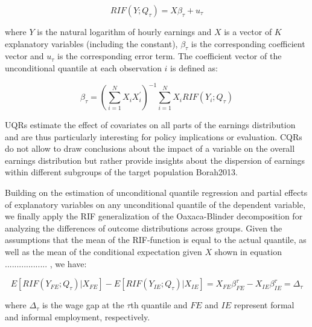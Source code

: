 \begin{linenomath*}
	\begin{equation}
		RIF(Y; Q_{\tau}) = X \beta_{\tau} + u_{\tau}
	\end{equation}
\end{linenomath*}

where $Y$ is the natural logarithm of hourly earnings and $X$ is a vector of $K$ explanatory variables (including the constant), $\beta_{\tau}$ is the corresponding coefficient vector and $u_{\tau}$ is the corresponding error term. The coefficient vector of the unconditional quantile at each observation $i$ is defined as:

\begin{linenomath*}
	\begin{equation}
		\beta_{\tau} = \left( \sum_{i=1}^{N} X_{i} X_{i}^{\prime} \right)^{-1} \sum_{i=1}^{N} X_{i} RIF(Y_{i}; Q_{\tau})
	\end{equation}
\end{linenomath*}

UQRs estimate the effect of covariates on all parts of the earnings distribution and are thus particularly interesting for policy implications or evaluation. CQRs do not allow to draw conclusions about the impact of a variable on the overall earnings distribution but rather provide insights about the dispersion of earnings within different subgroups of the target population Borah2013.

Building on the estimation of unconditional quantile regression and partial effects of explanatory variables on any unconditional quantile of the dependent variable, we finally apply the RIF generalization of the Oaxaca-Blinder decomposition for analyzing the differences of outcome distributions across groups. Given the assumptions that the mean of the RIF-function is equal to the actual quantile, as well as the mean of the conditional expectation given \( X \) shown in equation .................. , we have:

\begin{linenomath*}
	\begin{equation}
		E[RIF(Y_{FE}; Q_\tau)|X_{FE}] - E[RIF(Y_{IE}; Q_\tau)|X_{IE}] = X_{FE} \beta_{FE}^\tau - X_{IE} \beta_{IE}^\tau = \Delta_\tau
	\end{equation}
\end{linenomath*}

where \(\Delta_\tau\) is the wage gap at the \(\tau\)th quantile and \( FE \) and \( IE \) represent formal and informal employment, respectively.

